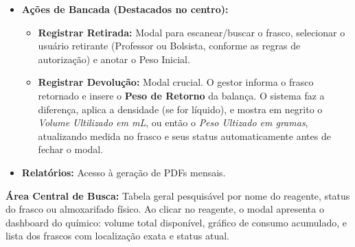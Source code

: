 \documentclass[12pt,a4paper]{article}
\begin{document}
\begin{itemize}
\begin{itemize}
        \item Adicionar Frasco: abre um modal para escolher o reagente a ser adicionado, o reagente pode ser pesquisado, por: nome, cas e formula química (deve ter um seletor para escolher, isso serve para não precisar pesquisar em todas as categorias de uma vez). Após selecionar o reagente a ser adcionado, fecha o modal de escolher reagente e passa a preencher o formulário para adicionar o frasco de reagente, o fórmulário deve conter:
         Selecionar o almoxarifao em que esse frasco vai ficar;\\
         Escrever o detalhamento do local (como: Segunda prateleira, na direita, etc) \\
         O número do lote em que esse frasco pertence. \\
         Pergunta o status dele: Fechado, Aberto, Quarentena (em caso de quarente, aparece um campo em texto para ser escrito explicando o motivo de estar em quarentena)
         O campo "tipo" em Resumo de reagente que determina os campos a serem pedidos abaixo (sólido ou líquido) \\
        líquido ->
\begin{itemize}
    \item Se é do tipo fechado, pede apenas a volume do líquido e o peso total com o frasco. (calcula o peso do frasco, mostra o peso do frasco mas não pode ser editado.)
    \item Se é do tipo Aberto, pede o peso do frasco, ...
\end{itemize} 
        sólido -> pede peso 
         
    \end{itemize}
    \item \textbf{Ações de Bancada (Destacados no centro):} 
    \begin{itemize}
        \item \textbf{Registrar Retirada:} Modal para escanear/buscar o frasco, selecionar o usuário retirante (Professor ou Bolsista, conforme as regras de autorização) e anotar o Peso Inicial.
        \item \textbf{Registrar Devolução:} Modal crucial. O gestor informa o frasco retornado e insere o \textbf{Peso de Retorno} da balança. O sistema faz a diferença, aplica a densidade (se for líquido), e mostra em negrito o \textit{Volume Ultilizado em mL}, ou então o \textit{Peso Ultizado em gramas}, atualizando medida no frasco e seus status automaticamente antes de fechar o modal.
    \end{itemize}
    \item \textbf{Relatórios:} Acesso à geração de PDFs mensais.
\end{itemize}
\textbf{Área Central de Busca:} Tabela geral pesquisável por nome do reagente, status do frasco ou almoxarifado físico. Ao clicar no reagente, o modal apresenta o dashboard do químico: volume total disponível, gráfico de consumo acumulado, e lista dos frascos com localização exata e status atual.
\end{document}
